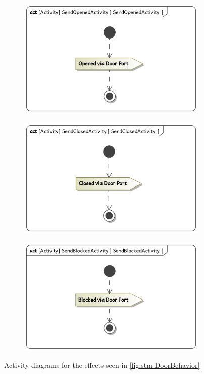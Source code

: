 \documentclass[a4paper]{article}
\begin{document}
\begin{figure}
	\begin{subfigure}{.33\textwidth}
		\includegraphics[width=\textwidth]
		{stm-DoorBehavior-SendOpenedActivity.jpg}
	\end{subfigure}
	\begin{subfigure}{.33\textwidth}
		\includegraphics[width=\textwidth]
		{stm-DoorBehavior-SendClosedActivity.jpg}
	\end{subfigure}
	\begin{subfigure}{.33\textwidth}
		\includegraphics[width=\textwidth]
		{stm-DoorBehavior-SendBlockedActivity.jpg}
	\end{subfigure}
	\caption{Activity diagrams for the effects seen in
		\cref{fig:stm-DoorBehavior}}%
	\label{fig:stm-DoorBehavior-effects}
\end{figure}
\end{document}
